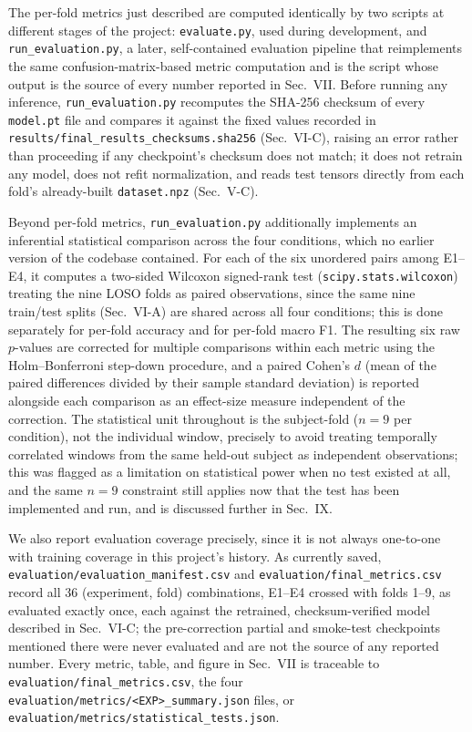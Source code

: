 \documentclass[conference]{IEEEtran}
\begin{document}
The per-fold metrics just described are computed identically by two
scripts at different stages of the project: \texttt{evaluate.py},
used during development, and \texttt{run\_evaluation.py}, a later,
self-contained evaluation pipeline that reimplements the same
confusion-matrix-based metric computation and is the script whose
output is the source of every number reported in Sec.~VII. Before
running any inference, \texttt{run\_evaluation.py} recomputes the
SHA-256 checksum of every \texttt{model.pt} file and compares it
against the fixed values recorded in
\texttt{results/final\_results\_checksums.sha256} (Sec.~VI-C),
raising an error rather than proceeding if any checkpoint's checksum
does not match; it does not retrain any model, does not refit
normalization, and reads test tensors directly from each fold's
already-built \texttt{dataset.npz} (Sec.~V-C).

Beyond per-fold metrics, \texttt{run\_evaluation.py} additionally
implements an inferential statistical comparison across the four
conditions, which no earlier version of the codebase contained.
For each of the six unordered pairs among E1--E4, it computes a
two-sided Wilcoxon signed-rank test (\texttt{scipy.stats.wilcoxon})
treating the nine LOSO folds as paired observations, since the same
nine train/test splits (Sec.~VI-A) are shared across all four
conditions; this is done separately for per-fold accuracy and for
per-fold macro F1. The resulting six raw $p$-values are corrected
for multiple comparisons within each metric using the
Holm--Bonferroni step-down procedure, and a paired Cohen's $d$
(mean of the paired differences divided by their sample standard
deviation) is reported alongside each comparison as an effect-size
measure independent of the correction. The statistical unit
throughout is the subject-fold ($n=9$ per condition), not the
individual window, precisely to avoid treating temporally correlated
windows from the same held-out subject as independent observations;
this was flagged as a limitation on statistical power when no test
existed at all, and the same $n=9$ constraint still applies now that
the test has been implemented and run, and is discussed further in
Sec.~IX.

We also report evaluation coverage precisely, since it is not always
one-to-one with training coverage in this project's history. As
currently saved, \texttt{evaluation/evaluation\_manifest.csv} and
\texttt{evaluation/final\_metrics.csv} record all 36
(experiment, fold) combinations, E1--E4 crossed with folds 1--9, as
evaluated exactly once, each against the retrained, checksum-verified
model described in Sec.~VI-C; the pre-correction partial and
smoke-test checkpoints mentioned there were never evaluated and are
not the source of any reported number. Every metric, table, and
figure in Sec.~VII is traceable to
\texttt{evaluation/final\_metrics.csv}, the four
\texttt{evaluation/metrics/<EXP>\_summary.json} files, or
\texttt{evaluation/metrics/statistical\_tests.json}.
\end{document}

